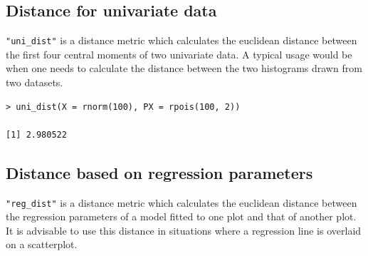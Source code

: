 \subsection{Distance for univariate
data}\label{distance-for-univariate-data}

\texttt{"uni\_dist"} is a distance metric which calculates the euclidean
distance between the first four central moments of two univariate data.
A typical usage would be when one needs to calculate the distance
between the two histograms drawn from two datasets.

%

\begin{verbatim}
> uni_dist(X = rnorm(100), PX = rpois(100, 2))

[1] 2.980522
\end{verbatim}

\subsection{Distance based on regression
parameters}\label{distance-based-on-regression-parameters}

\texttt{"reg\_dist"} is a distance metric which calculates the euclidean
distance between the regression parameters of a model fitted to one plot
and that of another plot. It is advisable to use this distance in
situations where a regression line is overlaid on a scatterplot.

%

